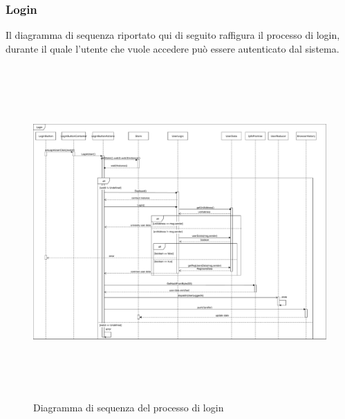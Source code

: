 		\subsubsection{Login}
		Il diagramma di sequenza riportato qui di seguito raffigura il processo di login, durante il quale l'utente che vuole accedere può essere autenticato dal sistema.
		
		\begin{figure}[h]
			\centering
				\includegraphics[height=5in]{./Diagrammi/DiagrammaSequenzaLogin2.pdf}
			\caption{Diagramma di sequenza del processo di login}
			\label{}
		\end{figure}
		
